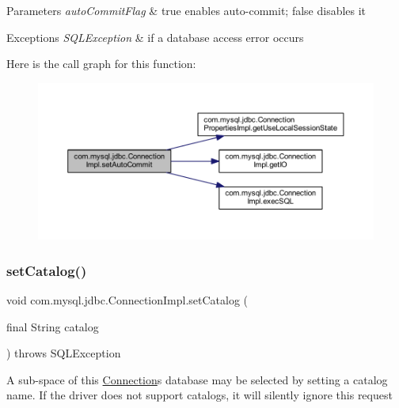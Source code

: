 \begin{DoxyParams}{Parameters}
{\em auto\+Commit\+Flag} & true enables auto-\/commit; false disables it \\
\hline
\end{DoxyParams}

\begin{DoxyExceptions}{Exceptions}
{\em S\+Q\+L\+Exception} & if a database access error occurs \\
\hline
\end{DoxyExceptions}
Here is the call graph for this function\+:\nopagebreak
\begin{figure}[H]
\begin{center}
\leavevmode
\includegraphics[width=350pt]{classcom_1_1mysql_1_1jdbc_1_1_connection_impl_aa5a8a261dfc670c3426f7949a56056ca_cgraph}
\end{center}
\end{figure}
\mbox{\label{classcom_1_1mysql_1_1jdbc_1_1_connection_impl_a70eceba08a9ec6b4e248e053d62ddc40}} 
\subsubsection{\texorpdfstring{set\+Catalog()}{setCatalog()}}
{\footnotesize\ttfamily void com.\+mysql.\+jdbc.\+Connection\+Impl.\+set\+Catalog (\begin{DoxyParamCaption}\item[{final String}]{catalog }\end{DoxyParamCaption}) throws S\+Q\+L\+Exception}

A sub-\/space of this \mbox{\hyperlink{interfacecom_1_1mysql_1_1jdbc_1_1_connection}{Connection}}\textquotesingle{}s database may be selected by setting a catalog name. If the driver does not support catalogs, it will silently ignore this request 

